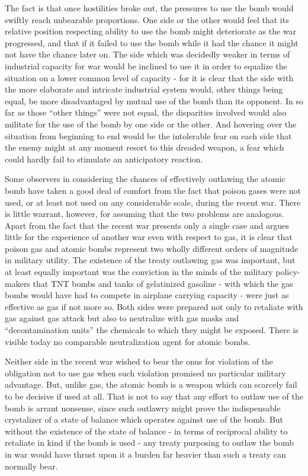 The fact is that once hostilities broke out, the pressures to use the bomb would swiftly reach unbearable proportions. One side or the other would feel that its relative position respecting ability to use the bomb might deteriorate as the war progressed, and that if it failed to use the bomb while it had the chance it might not have the chance later on. The side which was decidedly weaker in terms of industrial capacity for war would be inclined to use it in order to equalize the situation on a lower common level of capacity - for it is clear that the side with the more elaborate and intricate industrial system would, other things being equal, be more disadvantaged by mutual use of the bomb than its opponent. In so far as those ``other things'' were not equal, the disparities involved would also militate for the use of the bomb by one side or the other. And hovering over the situation from beginning to end would be the intolerable fear on each side that the enemy might at any moment resort to this dreaded weapon, a fear which could hardly fail to stimulate an anticipatory reaction.

Some observers in considering the chances of effectively outlawing the atomic bomb have taken a good deal of comfort from the fact that poison gases were not used, or at least not used on any considerable scale, during the recent war. There is little warrant, however, for assuming that the two problems are analogous. Apart from the fact that the recent war presents only a single case and argues little for the experience of another war even with respect to gas, it is clear that poison gas and atomic bombs represent two wholly different orders of magnitude in military utility. The existence of the treaty outlawing gas was important, but at least equally important was the conviction in the minds of the military policy-makers that TNT bombs and tanks of gelatinized gasoline - with which the gas bombs would have had to compete in airplane carrying capacity - were just as effective as gas if not more so. Both sides were prepared not only to retaliate with gas against gas attack but also to neutralize with gas masks and ``decontamination units'' the chemicals to which they might be exposed. There is visible today no comparable neutralization agent for atomic bombs.

Neither side in the recent war wished to bear the onus for violation of the obligation not to use gas when such violation promised no particular military advantage. But, unlike gas, the atomic bomb is a weapon which can scarcely fail to be decisive if used at all. That is not to say that any effort to outlaw use of the bomb is arrant nonsense, since such outlawry might prove the indispensable crystalizer of a state of balance which operates against use of the bomb. But without the existence of the state of balance - in terms of reciprocal ability to retaliate in kind if the bomb is used - any treaty purposing to outlaw the bomb in war would have thrust upon it a burden far heavier than such a treaty can normally bear.


